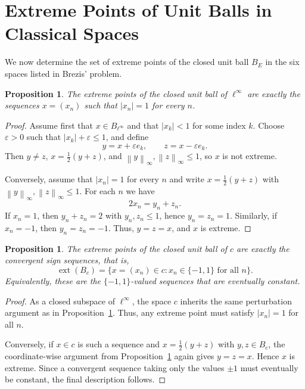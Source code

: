 \documentclass[reqno]{amsart}
\newtheorem{proposition}[theorem]{Proposition}
\theoremstyle{definition}
\newcommand{\norm}[1]{\left\lVert #1 \right\rVert}
\newcommand{\abs}[1]{\left\lvert #1 \right\rvert}
\newcommand{\ext}{\operatorname{ext}}
\begin{document}
\section{Extreme Points of Unit Balls in Classical Spaces}
We now determine the set of extreme points of the closed unit ball $B_E$ in the six spaces
listed in Brezis' problem.

\begin{proposition}\label{prop:linfty}
The extreme points of the closed unit ball of $\ell^\infty$ are exactly the sequences
$x = (x_n)$ such that $\abs{x_n} = 1$ for every $n$.
\end{proposition}

\begin{proof}
Assume first that $x \in B_{\ell^\infty}$ and that $\abs{x_k} < 1$ for some index $k$. Choose
$\varepsilon > 0$ such that $\abs{x_k} + \varepsilon \le 1$, and define
\begin{equation*}
    y = x + \varepsilon e_k, \qquad z = x - \varepsilon e_k.
\end{equation*}
Then $y \neq z$, $x = \frac12(y+z)$, and $\norm{y}_\infty, \norm{z}_\infty \le 1$, so $x$ is not extreme.

Conversely, assume that $\abs{x_n} = 1$ for every $n$ and write $x = \frac12(y+z)$ with
$\norm{y}_\infty, \norm{z}_\infty \le 1$. For each $n$ we have
\begin{equation*}
    2x_n = y_n + z_n.
\end{equation*}
If $x_n = 1$, then $y_n + z_n = 2$ with $y_n,z_n \le 1$, hence $y_n = z_n = 1$. Similarly, if
$x_n = -1$, then $y_n = z_n = -1$. Thus, $y = z = x$, and $x$ is extreme.
\end{proof}

\begin{proposition}\label{prop:c}
The extreme points of the closed unit ball of $c$ are exactly the convergent sign sequences,
that is,
\begin{equation}
    \ext(B_c) = \{x = (x_n) \in c : x_n \in \{-1,1\} \text{ for all } n\}.
\end{equation}
Equivalently, these are the $\{-1,1\}$-valued sequences that are eventually constant.
\end{proposition}

\begin{proof}
As a closed subspace of $\ell^\infty$, the space $c$ inherits the same perturbation argument as in Proposition~\ref{prop:linfty}. Thus, any extreme point must satisfy $\abs{x_n} = 1$ for all $n$.

Conversely, if $x \in c$ is such a sequence and $x = \frac12(y+z)$ with $y,z \in B_c$, the
coordinate-wise argument from Proposition~\ref{prop:linfty} again gives $y = z = x$. Hence $x$ is extreme. Since a convergent sequence taking only the values $\pm 1$ must eventually be
constant, the final description follows.
\end{proof}
\end{document}
